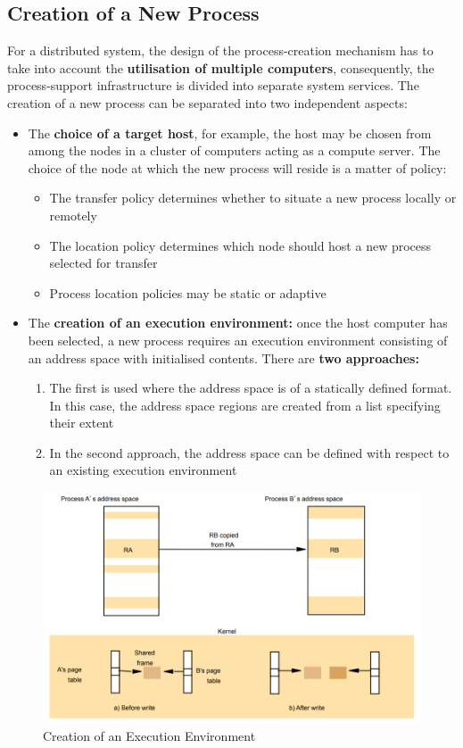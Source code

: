 \subsection{Creation of a New Process}
For a distributed system, the design of the process-creation mechanism has to take into account the \textbf{utilisation of multiple computers}, consequently, the process-support infrastructure is divided into separate system services.
The creation of a new process can be separated into two independent aspects:
\begin{itemize}
    \item The \textbf{choice of a target host}, for example, the host may be chosen from among the nodes in a cluster of computers acting as a compute server. The choice of the node at which the new process will reside is a matter of policy:
        \begin{itemize}
            \item The transfer policy determines whether to situate a new process locally or remotely
            \item The location policy determines which node should host a new process selected for transfer
            \item Process location policies may be static or adaptive
        \end{itemize}
    \item The \textbf{creation of an execution environment:} once the host computer has been selected, a new process requires an execution environment consisting of an address space with initialised contents. There are \textbf{two approaches:}
        \begin{enumerate}
            \item The first is used where the address space is of a statically defined format. In this case, the address space regions are created from a list specifying their extent
            \item In the second approach, the address space can be defined with respect to an existing execution environment
        \end{enumerate}
\end{itemize}

\begin{figure}[!h]
    \centering
    \includegraphics[width=.7\linewidth]{images/OperatingSystemSupport/executionenviroment.png}
    \caption{Creation of an Execution Environment}
\end{figure}


